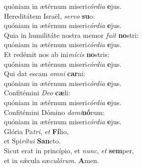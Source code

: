 \evenverse quóniam in ætérnum miseri\textit{cór}\textit{di}\textit{a} \textbf{e}jus.\\
\oddverse Hereditátem Israël, \textit{ser}\textit{vo} \textbf{su}o:~\*\\
\oddverse quóniam in ætérnum miseri\textit{cór}\textit{di}\textit{a} \textbf{e}jus.\\
\evenverse Quia in humilitáte nostra memor \textit{fu}\textit{it} \textbf{no}stri:~\*\\
\evenverse quóniam in ætérnum miseri\textit{cór}\textit{di}\textit{a} \textbf{e}jus.\\
\oddverse Et redémit nos ab ini\textit{mí}\textit{cis} \textbf{no}stris:~\*\\
\oddverse quóniam in ætérnum miseri\textit{cór}\textit{di}\textit{a} \textbf{e}jus.\\
\evenverse Qui dat escam \textit{om}\textit{ni} \textbf{car}ni:~\*\\
\evenverse quóniam in ætérnum miseri\textit{cór}\textit{di}\textit{a} \textbf{e}jus.\\
\oddverse Confitémini \textit{De}\textit{o} \textbf{cæ}li:~\*\\
\oddverse quóniam in ætérnum miseri\textit{cór}\textit{di}\textit{a} \textbf{e}jus.\\
\evenverse Confitémini Dómino \textit{do}\textit{mi}\textbf{nó}rum:~\*\\
\evenverse quóniam in ætérnum miseri\textit{cór}\textit{di}\textit{a} \textbf{e}jus.\\
\oddverse Glória Pa\textit{tri}, \textit{et} \textbf{Fí}lio,~\*\\
\oddverse et Spi\textit{rí}\textit{tu}\textit{i} \textbf{San}cto.\\
\evenverse Sicut erat in princípio, et \textit{nunc}, \textit{et} \textbf{sem}per,~\*\\
\evenverse et in sǽcula sæ\textit{cu}\textit{ló}\textit{rum}. \textbf{A}men.\\
